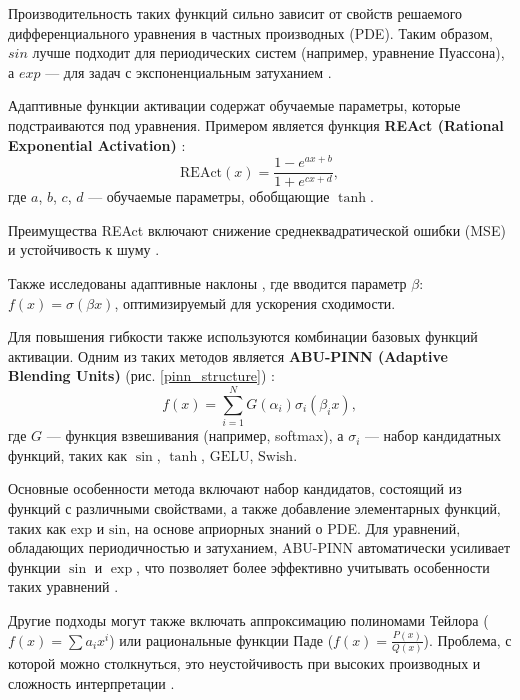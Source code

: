 Производительность таких функций сильно зависит от свойств решаемого дифференциального уравнения в частных
производных (PDE).  Таким образом, $sin$ лучше подходит для периодических систем (например, уравнение
Пуассона), а $exp$ — для задач с экспоненциальным затуханием \cite{fe520ccac2a6bd50f75a4a34022fe54116871013}.

Адаптивные функции активации содержат обучаемые параметры, которые подстраиваются под уравнения. Примером
является функция \textbf{REAct (Rational Exponential Activation)}
\cite{0d752c79fb816703274a3d37f85a85689a2a9405}:
\begin{equation}
\text{REAct}(x) = \frac{1 - e^{ax + b}}{1 + e^{cx + d}},
\label{eq:react}
\end{equation}
где $a$, $b$, $c$, $d$ — обучаемые параметры, обобщающие $\tanh$. 

Преимущества REAct включают снижение среднеквадратической ошибки (MSE) и устойчивость к шуму
\cite{0d752c79fb816703274a3d37f85a85689a2a9405}.

Также исследованы адаптивные наклоны \cite{7fcd4b3c875d8e41eb0c184aa1a42bf4c8906d61}, где вводится параметр
$\beta$: $f(x) = \sigma(\beta x)$, оптимизируемый для ускорения сходимости.

Для повышения гибкости также используются комбинации базовых функций активации. Одним из таких методов является
\textbf{ABU-PINN (Adaptive Blending Units)} (рис. \ref{pinn_structure}) \cite{Sutfeld2018-io}\cite{7fcd4b3c875d8e41eb0c184aa1a42bf4c8906d61}:
\begin{equation}
    f(x) = \sum_{i=1}^N G(\alpha_i) \sigma_i(\beta_i x),
    \label{eq:abu}
\end{equation}
где $G$ — функция взвешивания (например, softmax), а $\sigma_i$ — набор кандидатных функций, таких как
$\sin$, $\tanh$, $\mathrm{GELU}$, $\mathrm{Swish}$. 

Основные особенности метода включают набор кандидатов, состоящий из функций с различными свойствами, а
также добавление элементарных функций, таких как $\mathrm{exp}$ и $\mathrm{sin}$, на основе априорных знаний о PDE.
Для уравнений, обладающих периодичностью и затуханием, ABU-PINN автоматически усиливает функции
$\sin$ и $\exp$, что позволяет более эффективно учитывать особенности таких уравнений
\cite{7fcd4b3c875d8e41eb0c184aa1a42bf4c8906d61}.



Другие подходы могут также включать аппроксимацию полиномами Тейлора ($f(x) = \sum a_i x^i$) или
рациональные функции Паде ($f(x) = \frac{P(x)}{Q(x)}$).
Проблема, с которой можно столкнуться, это неустойчивость при высоких производных и сложность
интерпретации \cite{7fcd4b3c875d8e41eb0c184aa1a42bf4c8906d61}.

